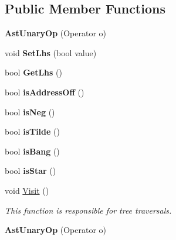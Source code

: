 \subsection*{Public Member Functions}
\begin{DoxyCompactItemize}
\item 
\hypertarget{classAstUnaryOp_aa363b2df2fbb4653a683899e59df2080}{{\bfseries Ast\-Unary\-Op} (Operator o)}\label{classAstUnaryOp_aa363b2df2fbb4653a683899e59df2080}

\item 
\hypertarget{classAstUnaryOp_a8fa646529a84c26cab9b3e39ed1c726c}{void {\bfseries Set\-Lhs} (bool value)}\label{classAstUnaryOp_a8fa646529a84c26cab9b3e39ed1c726c}

\item 
\hypertarget{classAstUnaryOp_a00fb9d26303867cc8ed269df7092975f}{bool {\bfseries Get\-Lhs} ()}\label{classAstUnaryOp_a00fb9d26303867cc8ed269df7092975f}

\item 
\hypertarget{classAstUnaryOp_a636862fa8cc5f8308eeed666e8cce5a4}{bool {\bfseries is\-Address\-Off} ()}\label{classAstUnaryOp_a636862fa8cc5f8308eeed666e8cce5a4}

\item 
\hypertarget{classAstUnaryOp_a7dddcaa6c182d6012e35d124c25c8e22}{bool {\bfseries is\-Neg} ()}\label{classAstUnaryOp_a7dddcaa6c182d6012e35d124c25c8e22}

\item 
\hypertarget{classAstUnaryOp_a02f2cdfdcf75a4c41cfd2168465c16b0}{bool {\bfseries is\-Tilde} ()}\label{classAstUnaryOp_a02f2cdfdcf75a4c41cfd2168465c16b0}

\item 
\hypertarget{classAstUnaryOp_ab9c6693eaa03da4daf18dc43f01c73d5}{bool {\bfseries is\-Bang} ()}\label{classAstUnaryOp_ab9c6693eaa03da4daf18dc43f01c73d5}

\item 
\hypertarget{classAstUnaryOp_aab9cd20f2a71757480827cb44b7cb0a3}{bool {\bfseries is\-Star} ()}\label{classAstUnaryOp_aab9cd20f2a71757480827cb44b7cb0a3}

\item 
void \hyperlink{classAstUnaryOp_a23e13d42f33d5882d58ca48e8053f1a0}{Visit} ()
\begin{DoxyCompactList}\small\item\em This function is responsible for tree traversals. \end{DoxyCompactList}\item 
\hypertarget{classAstUnaryOp_aa363b2df2fbb4653a683899e59df2080}{{\bfseries Ast\-Unary\-Op} (Operator o)}\label{classAstUnaryOp_aa363b2df2fbb4653a683899e59df2080}


\end{DoxyCompactItemize}
